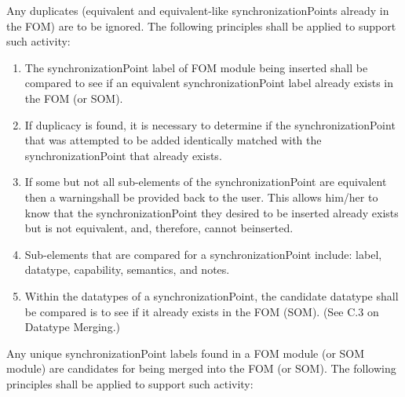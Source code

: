 Any duplicates (equivalent and equivalent-like synchronizationPoints already in the FOM) are to be ignored. The following principles shall be applied to support such activity:

\begin{enumerate}[leftmargin=52pt,labelsep=12pt,label=\arabic*),itemsep=0pt,topsep=-2pt,partopsep=0pt,parsep=0pt]
\item The synchronizationPoint label of FOM module being inserted shall be compared to see if an equivalent synchronizationPoint label already exists in the FOM (or SOM).
\item If duplicacy is found, it is necessary to determine if the synchronizationPoint that was attempted to be added identically matched with the synchronizationPoint that already exists.
\item If some but not all sub-elements of the synchronizationPoint are equivalent then a warning\linebreak shall be provided back to the user. This allows him/her to know that the synchronizationPoint they desired to be inserted already exists but is not equivalent, and, therefore, cannot be\linebreak inserted.
\item Sub-elements that are compared for a synchronizationPoint include: label, datatype, capability, semantics, and notes.
\item Within the datatypes of a synchronizationPoint, the candidate datatype shall be compared is to see if it already exists in the FOM (SOM). (See C.3 on Datatype Merging.)
\end{enumerate}

Any unique synchronizationPoint labels found in a FOM module (or SOM module) are candidates for being merged into the FOM (or SOM). The following principles shall be applied to support such activity:

